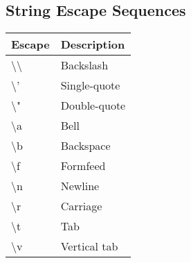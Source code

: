 \documentclass[12pt]{article}
\begin{document}
\subsection{String Escape Sequences}
\begin{tabular}{|l|p{1.5in}|}
	\hline
	\textbf{Escape} & \textbf{Description}\\ \hline
	\textbackslash\textbackslash & Backslash\\
	\textbackslash ' & Single-quote\\
	\textbackslash " & Double-quote\\
	\textbackslash a & Bell\\
	\textbackslash b & Backspace\\
	\textbackslash f & Formfeed\\
	\textbackslash n & Newline\\
	\textbackslash r & Carriage\\
	\textbackslash t & Tab\\
	\textbackslash v & Vertical tab\\
	
	\hline
\end{tabular}
\end{document}

